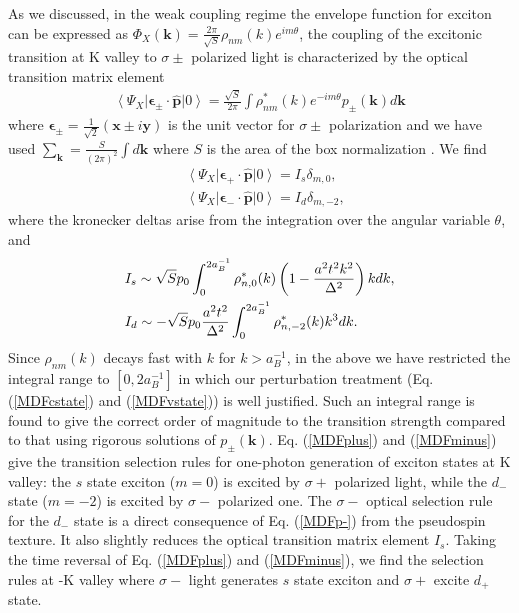 \documentclass[prb,twocolumn,amsmath,amssymb,superscriptaddress,showpacs]{revtex4}
\begin{document}
As we discussed, in the weak coupling regime the envelope function for exciton can be expressed as $\Phi_{X}(\mathbf{k})=\frac{2\pi}{\sqrt{S}}\rho_{nm}(k)e^{im\theta}$, the coupling of the excitonic transition  at K valley to $\sigma \pm$ polarized light is characterized by the optical transition matrix element
\begin{align}
\left\langle \Psi_{X}\right|\mathbf{\epsilon}_{\pm}\cdot\hat{\mathbf{p}}\left|0\right\rangle =\frac{\sqrt{S}}{2\pi}\int\rho_{nm}^{*}(k)e^{-im\theta}p_{\pm}(\mathbf{k})d\mathbf{k} \label{matrixelement}
\end{align}
where $\mathbf{\epsilon}_{\pm}=\frac{1}{\sqrt{2}}(\mathbf{x}\pm i\mathbf{y})$ is the unit vector for $\sigma \pm$ polarization and we have used $\sum_{\mathbf{k}}=\frac{S}{(2\pi)^{2}}\int d\mathbf{k}$ where $S$ is the area of the box normalization \cite{BoxNorm}. We find
\begin{subequations}
\label{selectionMDF}
\begin{align}
&\left\langle\Psi_{X}\right|\mathbf{\epsilon}_{+}\cdot\hat{\mathbf{p}}\left|0\right\rangle=I_{s}\delta_{m,0}, \label{MDFplus}\\
&\left\langle\Psi_{X}\right|\mathbf{\epsilon}_{-}\cdot\hat{\mathbf{p}}\left|0\right\rangle=I_{d}\delta_{m,-2}, \label{MDFminus}
 \end{align}
\end{subequations}
where the kronecker deltas arise from the integration over the angular variable $\theta$, and
\begin{align}
&I_{s} \sim \sqrt{S}p_0\int_{0}^{2a_{B}^{-1}}
 \rho_{n,0}^{*}(k)\left(1-\frac{a^{2}t^{2}k^{2}}{\Delta^{2}}\right)kdk, \notag\\
&I_{d}  \sim -\sqrt{S}p_0\frac{a^{2}t^{2}}{\Delta^{2}}\int_{0}^{2a_{B}^{-1}}
 \rho_{n,-2}^{*}(k)k^{3}dk. \label{dipolestrengthMDF}
\end{align}
Since $\rho_{nm}(k)$ decays fast with $k$ for $k>a_B^{-1}$, in the above we have restricted the integral range to $[0,2a_B^{-1}]$ in which our perturbation treatment (Eq. (\ref{MDFcstate}) and (\ref{MDFvstate})) is well justified. Such an integral range is found to give the correct order of magnitude to the transition strength compared to that using rigorous solutions of $p_\pm(\mathbf{k})$. Eq. (\ref{MDFplus}) and (\ref{MDFminus}) give the transition selection rules for one-photon generation of exciton states at K valley: the $s$ state exciton ($m=0$) is excited by $\sigma +$ polarized  light, while the $d_{-}$ state ($m=-2$) is excited by $\sigma -$ polarized one. The $\sigma-$ optical selection rule for the $d_-$ state is a direct consequence of Eq. (\ref{MDFp-}) from the pseudospin texture. It also slightly reduces the optical transition matrix element $I_s$. Taking the time reversal of Eq. (\ref{MDFplus}) and (\ref{MDFminus}), we find the selection rules at -K valley where $\sigma -$ light generates $s$ state exciton and $\sigma +$ excite $d_{+}$ state.
\end{document}
